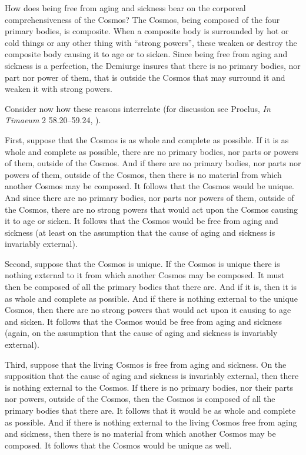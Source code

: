 How does being free from aging and sickness bear on the corporeal comprehensiveness of the Cosmos? The Cosmos, being composed of the four primary bodies, is composite. When a composite body is surrounded by hot or cold things or any other thing with ``strong powers'', these weaken or destroy the composite body causing it to age or to sicken. Since being free from aging and sickness is a perfection, the Demiurge insures that there is no primary bodies, nor part nor power of them, that is outside the Cosmos that may surround it and weaken it with strong powers. 

Consider now how these reasons interrelate (for discussion see Proclus, \emph{In Timaeum} 2 58.20--59.24, \citealt{Diehl:1903re}). 

First, suppose that the Cosmos is as whole and complete as possible. If it is as whole and complete as possible, there are no primary bodies, nor parts or powers of them, outside of the Cosmos. And if there are no primary bodies, nor parts nor powers of them, outside of the Cosmos, then there is no material from which another Cosmos may be composed. It follows that the Cosmos would be unique. And since there are no primary bodies, nor parts nor powers of them, outside of the Cosmos, there are no strong powers that would act upon the Cosmos causing it to age or sicken. It follows that the Cosmos would be free from aging and sickness (at least on the assumption that the cause of aging and sickness is invariably external).

Second, suppose that the Cosmos is unique. If the Cosmos is unique there is nothing external to it from which another Cosmos may be composed. It must then be composed of all the primary bodies that there are. And if it is, then it is as whole and complete as possible. And if there is nothing external to the unique Cosmos, then there are no strong powers that would act upon it causing to age and sicken.  It follows that the Cosmos would be free from aging and sickness (again, on the assumption that the cause of aging and sickness is invariably external).

Third, suppose that the living Cosmos is free from aging and sickness. On the supposition that the cause of aging and sickness is invariably external, then there is nothing external to the Cosmos. If there is no primary bodies, nor their parts nor powers, outside of the Cosmos, then the Cosmos is composed of all the primary bodies that there are. It follows that it would be as whole and complete as possible. And if there is nothing external to the living Cosmos free from aging and sickness, then there is no material from which another Cosmos may be composed. It follows that the Cosmos would be unique as well.

